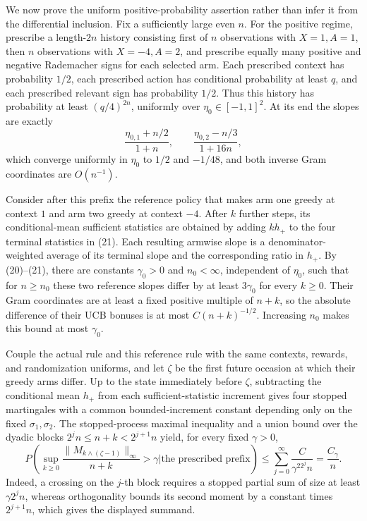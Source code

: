 We now prove the uniform positive-probability assertion rather than infer it from the differential inclusion.  Fix a sufficiently large even \(n\).  For the positive regime, prescribe a length-\(2n\) history consisting first of \(n\) observations with \(X=1,A=1\), then \(n\) observations with \(X=-4,A=2\), and prescribe equally many positive and negative Rademacher signs for each selected arm.  Each prescribed context has probability \(1/2\), each prescribed action has conditional probability at least \(q\), and each prescribed relevant sign has probability \(1/2\).  Thus this history has probability at least \((q/4)^{2n}\), uniformly over \(\eta_0\in[-1,1]^2\).  At its end the slopes are exactly
\[
 \frac{\eta_{0,1}+n/2}{1+n},\qquad
 \frac{\eta_{0,2}-n/3}{1+16n}, \tag{21}
\]
which converge uniformly in \(\eta_0\) to \(1/2\) and \(-1/48\), and both inverse Gram coordinates are \(O(n^{-1})\).

Consider after this prefix the reference policy that makes arm one greedy at context \(1\) and arm two greedy at context \(-4\).  After \(k\) further steps, its conditional-mean sufficient statistics are obtained by adding \(kh_+\) to the four terminal statistics in (21).  Each resulting armwise slope is a denominator-weighted average of its terminal slope and the corresponding ratio in \(h_+\).  By (20)--(21), there are constants \(\gamma_0>0\) and \(n_0<\infty\), independent of \(\eta_0\), such that for \(n\geq n_0\) these two reference slopes differ by at least \(3\gamma_0\) for every \(k\geq0\).  Their Gram coordinates are at least a fixed positive multiple of \(n+k\), so the absolute difference of their UCB bonuses is at most \(C(n+k)^{-1/2}\).  Increasing \(n_0\) makes this bound at most \(\gamma_0\).

Couple the actual rule and this reference rule with the same contexts, rewards, and randomization uniforms, and let \(\zeta\) be the first future occasion at which their greedy arms differ.  Up to the state immediately before \(\zeta\), subtracting the conditional mean \(h_+\) from each sufficient-statistic increment gives four stopped martingales with a common bounded-increment constant depending only on the fixed \(\sigma_1,\sigma_2\).  The stopped-process maximal inequality and a union bound over the dyadic blocks \(2^jn\leq n+k<2^{j+1}n\) yield, for every fixed \(\gamma>0\),
\[
 P\left(\sup_{k\geq0}\frac{\|M_{k\wedge(\zeta-1)}\|_\infty}{n+k}>\gamma
 \mathrel{\Big|}\text{the prescribed prefix}\right)
 \leq \sum_{j=0}^{\infty}\frac{C}{\gamma^22^jn}
 =\frac{C_\gamma}{n}. \tag{22}
\]
Indeed, a crossing on the \(j\)-th block requires a stopped partial sum of size at least \(\gamma2^jn\), whereas orthogonality bounds its second moment by a constant times \(2^{j+1}n\), which gives the displayed summand.

